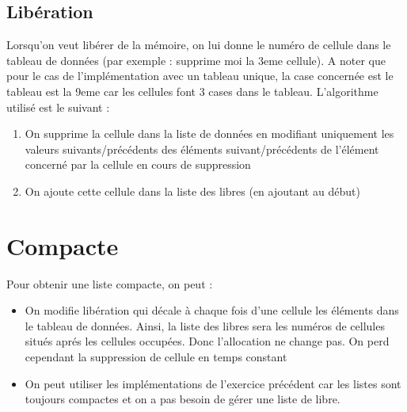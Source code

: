 \documentclass{report}
\begin{document}
      \subsection{Libération}
        Lorsqu'on veut libérer de la mémoire, on lui donne le numéro de cellule dans le tableau de données (par exemple : supprime moi la 3eme cellule). A noter que pour le cas de l'implémentation avec un tableau unique, la case concernée est le tableau est la 9eme car les cellules font 3 cases dans le tableau.
        L'algorithme utilisé est le suivant :
        \begin{enumerate}
          \item On supprime la cellule dans la liste de données en modifiant uniquement les valeurs suivants/précédents des éléments suivant/précédents de l'élément concerné par la cellule en cours de suppression
          \item On ajoute cette cellule dans la liste des libres (en ajoutant au début)
        \end{enumerate}
    \section{Compacte}
      Pour obtenir une liste compacte, on peut :
      \begin{itemize}
        \item On modifie libération qui décale à chaque fois d'une cellule les éléments dans le tableau de données. Ainsi, la liste des libres sera les numéros de cellules situés aprés les cellules occupées. Donc l'allocation ne change pas. On perd cependant la suppression de cellule en temps constant
        \item On peut utiliser les implémentations de l'exercice précédent car les listes sont toujours compactes et on a pas besoin de gérer une liste de libre.
      \end{itemize}
\end{document}
